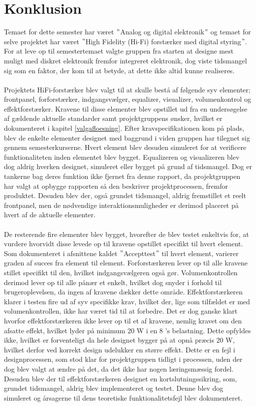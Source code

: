 \chapter{Konklusion}
\label{konklusion}
Temaet for dette semester har været $"$Analog og digital elektronik$"$ og temaet for selve projektet har været $"$High Fidelity (Hi-Fi) forstærker med digital styring$"$. For at leve op til semestertemaet valgte gruppen fra starten at designe mest muligt med diskret elektronik fremfor integreret elektronik, dog viste tidsmangel sig som en faktor, der kom til at betyde, at dette ikke altid kunne realiseres.\\\\
Projektets HiFi-forstærker blev valgt til at skulle bestå af følgende syv elementer; frontpanel, forforstærker, indgangsvælger, equalizer, visualizer, volumenkontrol og effektforstærker. Kravene til disse elementer blev opstillet ud fra en undersøgelse af gældende aktuelle standarder samt projektgruppens ønsker, hvilket er dokumenteret i kapitel \ref{valgafloesning}. Efter kravspecifikationen kom på plads, blev de enkelte elementer designet med baggrund i viden gruppen har tilegnet sig gennem semesterkurserne. Hvert element blev desuden simuleret for at verificere funktionaliteten inden elementet blev bygget. Equalizeren og visualizeren blev dog aldrig hverken designet, simuleret eller bygget på grund af tidsmangel. Dog er tankerne bag deres funktion ikke fjernet fra denne rapport, da projektgruppen har valgt at opbygge rapporten så den beskriver projektprocessen, fremfor produktet. Desuden blev der, også grundet tidsmangel, aldrig fremstillet et reelt frontpanel, men de nødvendige interaktionsmuligheder er derimod placeret på hvert af de aktuelle elementer.\\\\
De resterende fire elementer blev bygget, hvorefter de blev testet enkeltvis for, at vurdere hvorvidt disse levede op til kravene opstillet specifikt til hvert element. Som dokumenteret i afsnittene kaldet $"$Accepttest$"$ til hvert element, varierer graden af succes fra element til element. Forforstærkeren lever op til alle kravene stillet specifikt til den, hvilket indgangsvælgeren også gør. Volumenkontrollen derimod lever op til alle pånær et enkelt, hvilket dog snyder i forhold til brugeroplevelsen, da ingen af kravene dækker dette område. Effektforstærkeren klarer i testen fire ud af syv specifikke krav, hvilket der, lige som tilfældet er med volumenkontrollen, ikke har været tid til at forbedre. Det er dog ganske klart hvorfor effektforstærkeren ikke lever op til et af kravene, nemlig kravet om den afsatte effekt, hvilket lyder på minimum 20 W i en 8 \ohm 's belastning. Dette opfyldes ikke, hvilket er forventeligt da hele designet bygger på at opnå præcis 20 W, hvilket derfor ved korrekt design udelukker en større effekt. Dette er en fejl i designprocessen, som stod klar for projektgruppen tidligt i processen, uden der dog blev valgt at ændre på det, da det ikke har nogen læringsmæssig fordel. Desuden blev der til effektforstærkeren designet en kortslutningssikring, som, grundet tidsmangel, aldrig blev implementeret og testet. Denne blev dog simuleret og årsagerne til dens teoretiske funktionalitetsfejl blev dokumenteret.\\\\
